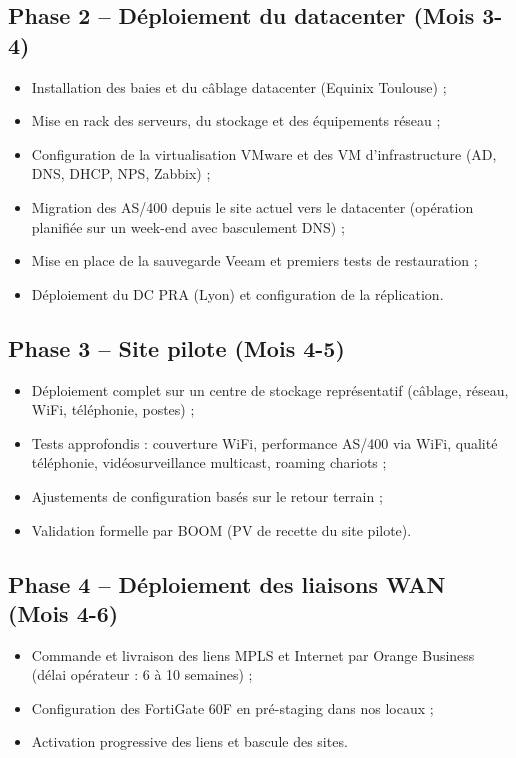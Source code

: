 \documentclass[12pt,a4paper]{report}
\begin{document}
\subsection{Phase 2 -- Déploiement du datacenter (Mois 3-4)}

\begin{itemize}
\item Installation des baies et du câblage datacenter (Equinix Toulouse) ;
\item Mise en rack des serveurs, du stockage et des équipements réseau ;
\item Configuration de la virtualisation VMware et des VM d'infrastructure (AD, DNS, DHCP, NPS, Zabbix) ;
\item Migration des AS/400 depuis le site actuel vers le datacenter (opération planifiée sur un week-end avec basculement DNS) ;
\item Mise en place de la sauvegarde Veeam et premiers tests de restauration ;
\item Déploiement du DC PRA (Lyon) et configuration de la réplication.
\end{itemize}

\subsection{Phase 3 -- Site pilote (Mois 4-5)}

\begin{itemize}
\item Déploiement complet sur un centre de stockage représentatif (câblage, réseau, WiFi, téléphonie, postes) ;
\item Tests approfondis : couverture WiFi, performance AS/400 via WiFi, qualité téléphonie, vidéosurveillance multicast, roaming chariots ;
\item Ajustements de configuration basés sur le retour terrain ;
\item Validation formelle par BOOM (PV de recette du site pilote).
\end{itemize}

\subsection{Phase 4 -- Déploiement des liaisons WAN (Mois 4-6)}

\begin{itemize}
\item Commande et livraison des liens MPLS et Internet par Orange Business (délai opérateur : 6 à 10 semaines) ;
\item Configuration des FortiGate 60F en pré-staging dans nos locaux ;
\item Activation progressive des liens et bascule des sites.
\end{itemize}
\end{document}
